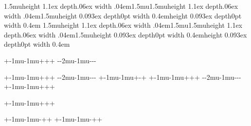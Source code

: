 
\def\utbar{\vrule height 0.093ex depth0pt width 0.4em}%
\let\dtbar\utbar%
\def\rtbar{\mkern1.5mu\vrule height 1.1ex depth.06ex width .04em\mkern1.5mu}%
\let\ltbar\rtbar%
\rtbar\ltbar\dtbar\utbar%
\newarrowtail{|}\rtbar\ltbar\dtbar\utbar%


\def\rthooka{\raisehook{}+\subset\mkern-1mu}%
\def\lthooka{\mkern-1mu\raisehook{}+\supset}%
\def\rthookb{\raisehook{}-\subset\mkern-2mu}%
\def\lthookb{\mkern-1mu\raisehook{}-\supset}%

\def\dthooka{\shifthook{}+\cap}%
\def\dthookb{\shifthook{}-\cap}%
\def\uthooka{\shifthook{}+\cup}%
\def\uthookb{\shifthook{}-\cup}%

\rthooka\lthooka\dthooka\uthooka
{}\rthookb\lthookb\dthookb\uthookb

\ifx\boldmath\undefined
  \rthooka\lthooka\dthooka\uthooka
  \rthookb\lthookb\dthookb\uthookb
  \rthooka\lthooka\dthookb\uthooka
\else
  \def\rtbhooka{\raisehook\boldmath+\subset\mkern-1mu}%
  \def\ltbhooka{\mkern-1mu\raisehook\boldmath+\supset}%
  \def\rtbhookb{\raisehook\boldmath-\subset\mkern-2mu}%
  \def\ltbhookb{\mkern-1mu\raisehook\boldmath-\supset}%
  \def\dtbhooka{\shifthook\boldmath+\cap}%
  \def\dtbhookb{\shifthook\boldmath-\cap}%
  \def\utbhooka{\shifthook\boldmath+\cup}%
  \def\utbhookb{\shifthook\boldmath-\cup}%
  \rtbhooka\ltbhooka\dtbhooka\utbhooka
  \rtbhookb\ltbhookb\dtbhookb\utbhookb
  \rtbhooka\ltbhooka\dtbhooka\utbhooka
\fi

\def\dtsqhooka{\shifthook{}+\sqcap}%
\def\dtsqhookb{\shifthook{}-\sqcap}%
\def\ltsqhooka{\mkern-1mu\raisehook{}+\sqsupset}%
\def\ltsqhookb{\mkern-1mu\raisehook{}-\sqsupset}%
\def\rtsqhooka{\raisehook{}+\sqsubset\mkern-1mu}%
\def\rtsqhookb{\raisehook{}-\sqsubset\mkern-2mu}%
\def\utsqhooka{\shifthook{}+\sqcup}%
\def\utsqhookb{\shifthook{}-\sqcup}%
\rtsqhooka\ltsqhooka\dtsqhooka\utsqhooka

\rthooka\lthookb\dthooka\uthooka
{}\rthooka\lthookb\dthooka\uthooka

